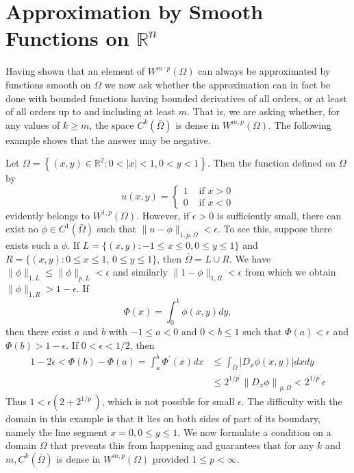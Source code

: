 \section{Approximation by Smooth Functions on $\mathbb{R}^n$}


\begin{para}
  Having shown that an element of $W^{m \cdot p}(\Omega)$ can always be approximated by functions 
  smooth on $\Omega$ we now ask whether the approximation can in fact be done with bounded 
  functions having bounded derivatives of all orders, or at least of all orders up to and 
  including at least $m$. That is, we are asking whether, for any values of $k \geq m$, the space 
  $C^k(\bar{\Omega})$ is dense in $W^{m, p}(\Omega)$. The following example shows that the answer 
  may be negative.
\end{para}


\begin{example}
  Let $\Omega=\left\{(x, y) \in \mathbb{R}^2: 0<|x|<1,0<y<1\right\}$. Then the function defined on $\Omega$ by
  \[
  u(x, y)= \begin{cases}1 & \text { if } x>0 \\ 0 & \text { if } x<0\end{cases}
  \]
  evidently belongs to $W^{1, p}(\Omega)$. However, if $\epsilon>0$ is sufficiently small, there can exist no $\phi \in C^1(\bar{\Omega})$ such that $\|u-\phi\|_{1, p, \Omega}<\epsilon$. To see this, suppose there exists such a $\phi$. If $L=\{(x, y):-1 \leq x \leq 0,0 \leq y \leq 1\}$ and $R=\{(x, y): 0 \leq x \leq 1$, $0 \leq y \leq 1\}$, then $\bar{\Omega}=L \cup R$. We have $\|\phi\|_{1, L} \leq\|\phi\|_{p, L}<\epsilon$ and similarly $\|1-\phi\|_{1, R}<\epsilon$ from which we obtain $\|\phi\|_{1, R}>1-\epsilon$. If
  \[
  \Phi(x)=\int_0^1 \phi(x, y) d y,
  \]
  then there exist $a$ and $b$ with $-1 \leq a<0$ and $0<b \leq 1$ such that $\Phi(a)<\epsilon$ and $\Phi(b)>1-\epsilon$. If $0<\epsilon<1 / 2$, then
  \[
  \begin{aligned}
  1-2 \epsilon<\Phi(b)-\Phi(a)=\int_a^b \Phi^{\prime}(x) d x & \leq \int_{\bar{\Omega}}\left|D_x \phi(x, y)\right| d x d y \\
  & \leq 2^{1 / p^{\prime}}\left\|D_x \phi\right\|_{p, \Omega}<2^{1 / p^{\prime}} \epsilon
  \end{aligned}
  \]
  Thus $1<\epsilon\left(2+2^{1 / p^{\prime}}\right)$, which is not possible for small $\epsilon$.
  The difficulty with the domain in this example is that it lies on both sides of part of its boundary, namely the line segment $x=0,0 \leq y \leq 1$. We now formulate a condition on a domain $\Omega$ that prevents this from happening and guarantees that for any $k$ and $m, C^k(\bar{\Omega})$ is dense in $W^{m, p}(\Omega)$ provided $1 \leq p<\infty$.
\end{example}


